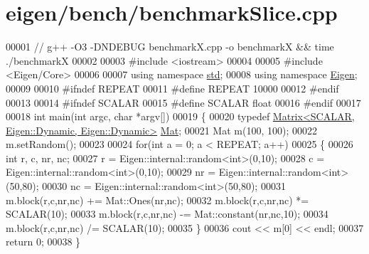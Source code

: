 \hypertarget{eigen_2bench_2benchmark_slice_8cpp_source}{}\section{eigen/bench/benchmark\+Slice.cpp}
\label{eigen_2bench_2benchmark_slice_8cpp_source}

\begin{DoxyCode}
00001 \textcolor{comment}{// g++ -O3 -DNDEBUG benchmarkX.cpp -o benchmarkX && time ./benchmarkX}
00002 
00003 \textcolor{preprocessor}{#include <iostream>}
00004 
00005 \textcolor{preprocessor}{#include <Eigen/Core>}
00006 
00007 \textcolor{keyword}{using namespace }\hyperlink{namespacestd}{std};
00008 \textcolor{keyword}{using namespace }\hyperlink{namespace_eigen}{Eigen};
00009 
00010 \textcolor{preprocessor}{#ifndef REPEAT}
00011 \textcolor{preprocessor}{#define REPEAT 10000}
00012 \textcolor{preprocessor}{#endif}
00013 
00014 \textcolor{preprocessor}{#ifndef SCALAR}
00015 \textcolor{preprocessor}{#define SCALAR float}
00016 \textcolor{preprocessor}{#endif}
00017 
00018 \textcolor{keywordtype}{int} main(\textcolor{keywordtype}{int} argc, \textcolor{keywordtype}{char} *argv[])
00019 \{
00020   \textcolor{keyword}{typedef} \hyperlink{group___core___module_class_eigen_1_1_matrix}{Matrix<SCALAR, Eigen::Dynamic, Eigen::Dynamic>} 
      \hyperlink{group___core___module}{Mat};
00021   Mat m(100, 100);
00022   m.setRandom();
00023 
00024   \textcolor{keywordflow}{for}(\textcolor{keywordtype}{int} a = 0; a < REPEAT; a++)
00025   \{
00026     \textcolor{keywordtype}{int} r, c, nr, nc;
00027     r = Eigen::internal::random<int>(0,10);
00028     c = Eigen::internal::random<int>(0,10);
00029     nr = Eigen::internal::random<int>(50,80);
00030     nc = Eigen::internal::random<int>(50,80);
00031     m.block(r,c,nr,nc) += Mat::Ones(nr,nc);
00032     m.block(r,c,nr,nc) *= SCALAR(10);
00033     m.block(r,c,nr,nc) -= Mat::constant(nr,nc,10);
00034     m.block(r,c,nr,nc) /= SCALAR(10);
00035   \}
00036   cout << m[0] << endl;
00037   \textcolor{keywordflow}{return} 0;
00038 \}
\end{DoxyCode}
